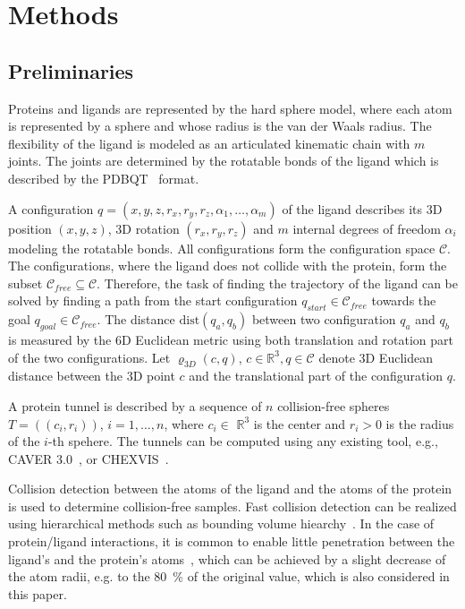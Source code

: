\documentclass{bmcart}
\def\qstart{q_{start}}
\def\qgoal{q_{goal}}
\def\C{\mathcal{C}}
\def\CF{\mathcal{C}_{free}}
\def\dist{\varrho}
\def\distt{\varrho_{3D}}
\def\R{\mathbb{R}}
\def\dist{\mathrm{dist}}
\begin{document}
\section*{Methods}

\subsection*{Preliminaries}

Proteins and ligands are represented by the hard sphere model, where each atom is represented by a sphere and whose radius 
is the van der Waals radius.
The flexibility of the ligand is modeled as an articulated kinematic chain with $m$ joints.
The joints are determined by the rotatable bonds of the ligand which is described by the PDBQT~\cite{pdbqt} format.

A configuration $q=(x,y,z,r_x,r_y,r_z, \alpha_1,\ldots,\alpha_m)$ of the ligand describes its 3D 
position $(x,y,z)$, 3D rotation $(r_x,r_y,r_z)$ and $m$ internal degrees of freedom $\alpha_i$ modeling  the rotatable bonds.
All configurations form the configuration space $\C$.
The configurations, where the ligand does not collide with the protein, form the subset $\CF \subseteq \C$.
Therefore, the task of finding the trajectory of the ligand can be solved by finding a path from the
start configuration $\qstart \in \CF$ towards the goal $\qgoal \in \CF$.
The distance $\dist(q_a,q_b)$ between two configuration $q_a$ and $q_b$ is measured by the 6D Euclidean metric using
both translation and rotation part of the two configurations.
Let $\distt(c,q)$, $c \in \R^3, q \in \C$ denote 3D Euclidean distance between the 3D point $c$ and
the translational part of the configuration $q$.

A protein tunnel is described by a sequence of $n$ collision-free spheres $T=( (c_i, r_i) )$, $i=1,\ldots,n$, 
where $c_i \in$ $\mathbb{R}^3$ is the center and $r_i > 0$ is the radius of the $i$-th spehere.
The tunnels can be computed using any existing tool, e.g., CAVER 3.0~\cite{caver3}, or CHEXVIS~\cite{masood2015chexvis}.

Collision detection between the atoms of the ligand and the atoms of the protein is used
to determine collision-free samples.
Fast collision detection can be realized using hierarchical methods such as bounding volume hiearchy~\cite{ericson2004real}.
In the case of protein/ligand interactions, it is common to enable little penetration between the ligand's and 
the protein's atoms~\cite{cortes2010simulating}, which can be achieved by a slight decrease
of the atom radii, e.g. to the 80~\% of the original value, which is also considered in this paper.
\end{document}

